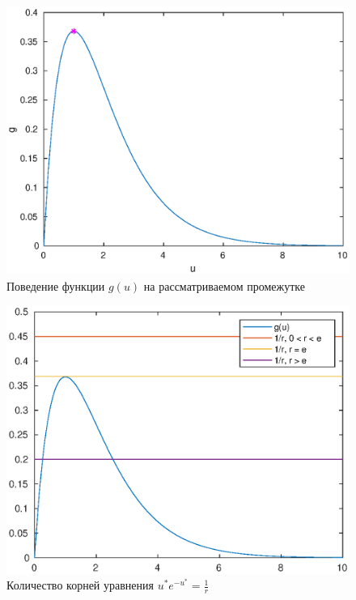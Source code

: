 \begin{figure}[h]
        \centering
        \includegraphics[width=0.8\linewidth]{first_discrete_system/searching_of_fixed_points/g.eps}
        \caption{Поведение функции $g(u)$ на рассматриваемом промежутке}
        \label{img:helped_function_g}
\end{figure}

\begin{figure}[h]
        \centering
        \includegraphics[width=0.8\linewidth]{first_discrete_system/searching_of_fixed_points/roots.eps}
        \caption{Количество корней уравнения $u^* e^{-u^*} = \frac{1}{r}$}
        \label{img:one_step_system_solve_fix}
\end{figure}

\clearpage